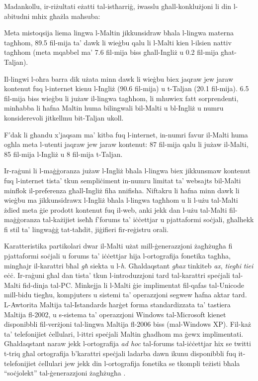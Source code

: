 \documentclass[]{../../metanetpaper}
\begin{document}
\begin{multicols}{2}
Madankollu, ir-riżultati eżatti tal-istħarriġ, iwasslu għall-konklużjoni li din l-abitudni mhix għażla maħsuba:
    
Meta mistoqsija liema lingwa l-Maltin jikkunsidraw bħala l-lingwa materna tagħhom, 89.5 fil-mija ta’ dawk li wieġbu qalu li l-Malti kien l-ilsien nattiv tagħhom (meta mqabbel ma’ 7.6 fil-mija biss għall-Ingliż u 0.2 fil-mija għat-Taljan).
    
Il-lingwi l-oħra barra dik użata minn dawk li wieġbu biex jaqraw jew jaraw kontenut fuq l-internet kienu l-Ingliż (90.6 fil-mija) u t-Taljan (20.1 fil-mija). 6.5 fil-mija biss wieġbu li jużaw il-lingwa tagħhom, li mhuwiex fatt sorprendenti, minħabba li ħafna Maltin huma bilingwali bil-Malti u bl-Ingliż u numru konsiderevoli jitkellmu bit-Taljan ukoll.
    
F’dak li għandu x’jaqsam ma’ kitba fuq l-internet, in-numri favur il-Malti huma ogħla meta l-utenti jaqraw jew jaraw kontenut: 87 fil-mija qalu li jużaw il-Malti, 85 fil-mija l-Ingliż u 8 fil-mija t-Taljan.
    
Ir-raġuni li l-maġġoranza jużaw l-Ingliż bħala l-lingwa biex jikkunsmaw kontenut fuq l-internet tista’ tkun sempliċiment in-numru limitat ta’ websajts bil-Malti minflok il-preferenza għall-Ingliż fiha nnifisha. Niftakru li ħafna minn dawk li wieġbu ma jikkunsidrawx l-Ingliż bħala l-lingwa tagħhom u li l-użu tal-Malti żdied meta ġie prodott kontenut fuq il-web, anki jekk dan l-użu tal-Malti fil-maġġoranza tal-każijiet iseħħ f’forums ta’ iċċettjar u pjattaformi soċjali, għalhekk fi stil ta’ lingwaġġ tat-taħdit, jiġifieri fir-reġistru orali.
    
Karatteristika partikolari dwar il-Malti użat mill-ġenerazzjoni żagħżugħa fi pjattaformi soċjali u forums ta’ iċċettjar hija l-ortografija fonetika tagħha, mingħajr il-karattri bħal \emph{għ} siekta u l-\emph{h}. Għaldaqstant \emph{għax} tinkiteb \emph{ax}, \emph{tiegħi} \emph{tiei} eċċ. Ir-raġuni għal dan tista’ tkun l-introduzzjoni tard tal-karattri speċjali tal-Malti fid-dinja tal-PC. Minkejja li l-Malti ġie implimentat fil-qafas tal-Unicode mill-bidu tiegħu, kompjuters u sistemi ta’ operazzjoni segwew ħafna aktar tard. L-Awtorita Maltija tal-Istandards ħarġet forma standardizzata ta’ tastiera Maltija fl-2002, u s-sistema ta’ operazzjoni Windows tal-Microsoft kienet disponibbli fil-verżjoni tal-lingwa Maltija fl-2006 biss (mal-Windows XP). Fil-każ ta’ telefonijiet ċellulari, l-ittri speċjali Maltin għadhom ma ġewx implimentati. Għaldaqstant naraw jekk l-ortografija \emph{ad hoc} tal-forums tal-iċċettjar hix se twitti t-triq għal ortografija b’karattri speċjali ladarba dawn ikunu disponibbli fuq it-telefonijiet ċellulari jew jekk din l-ortografija fonetika se tkompli teżisti bħala ``soċjolekt'' tal-ġenerazzjoni żagħżugħa \cite{Fabri:2011b}.
    

\end{multicols}
\end{document}
